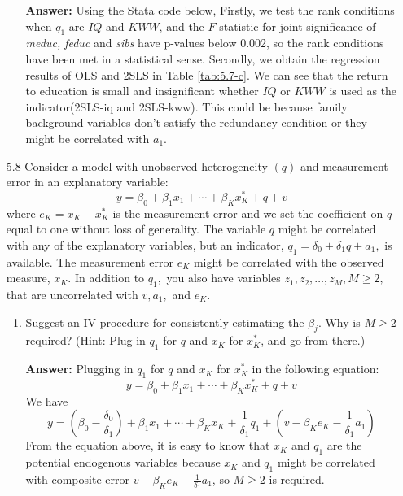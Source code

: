\documentclass[UTF8]{article} %
\begin{document}
\begin{enumerate}
\begin{enumerate}
        \textbf{Answer:} Using the Stata code below, Firstly, we test the rank conditions when $q_1$ are $IQ$ and $KWW$, and the $F$ statistic for joint significance of \textit{meduc, feduc} and \textit{sibs} have p-values below 0.002, so the rank conditions have been met in a statistical sense. Secondly, we obtain the regression results of OLS and 2SLS in Table \ref{tab:5.7-c}. We can see that the return to education is small and insignificant whether $IQ$ or $KWW$ is used as the indicator(2SLS-iq and 2SLS-kww). This could be because family background variables don't satisfy the redundancy condition or they might be correlated with $a_1$.
        
        
    \end{enumerate}
    
    
    \item[5.8] Consider a model with unobserved heterogeneity $(q)$ and measurement error in an explanatory variable:
    \[ y=\beta_{0}+\beta_{1} x_{1}+\cdots+\beta_{K} x_{K}^{*}+q+v \]
    where $e_{K}=x_{K}-x_{K}^{*}$ is the measurement error and we set the coefficient on $q$ equal to one without loss of generality. The variable $q$ might be correlated with any of the explanatory variables, but an indicator, $q_{1}=\delta_{0}+\delta_{1} q+a_{1},$ is available. The measurement error $e_{K}$ might be correlated with the observed measure, $x_{K} .$ In addition to $q_{1},$ you also have variables $z_{1}, z_{2}, \ldots, z_{M}, M \geq 2,$ that are uncorrelated with $v, a_{1},$ and $e_{K}$.
    \begin{enumerate}
        \item Suggest an IV procedure for consistently estimating the $\beta_{j} .$ Why is $M \geq 2$ required? (Hint: Plug in $q_{1}$ for $q$ and $x_{K}$ for $x_{K}^{*}$, and go from there.)
        
        \textbf{Answer:} Plugging in $q_1$ for $q$ and $x_K$ for $x_K^*$ in the following equation: 
        \[ y=\beta_{0}+\beta_{1} x_{1}+\cdots+\beta_{K} x_{K}^{*}+q+v \]
        We have
        \[ y=\left(\beta_{0}-\frac{\delta_0}{\delta_1}\right) + \beta_{1} x_{1}+\cdots+\beta_{K} x_{K} + \frac{1}{\delta_1}q_1+\left(v-\beta_K e_K-\frac{1}{\delta_1}a_1\right) \]
        From the equation above, it is easy to know that $x_K$ and $q_1$ are the potential endogenous variables because $x_K$ and $q_1$ might be correlated with composite error $v-\beta_K e_K-\frac{1}{\delta_1}a_1$, so $M\geq 2$ is required.
        

\end{enumerate}
\end{enumerate}
\end{document}
